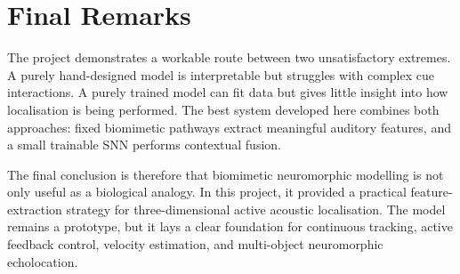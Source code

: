 \section{Final Remarks}

The project demonstrates a workable route between two unsatisfactory extremes. A purely hand-designed model is interpretable but struggles with complex cue interactions. A purely trained model can fit data but gives little insight into how localisation is being performed. The best system developed here combines both approaches: fixed biomimetic pathways extract meaningful auditory features, and a small trainable SNN performs contextual fusion.

The final conclusion is therefore that biomimetic neuromorphic modelling is not only useful as a biological analogy. In this project, it provided a practical feature-extraction strategy for three-dimensional active acoustic localisation. The model remains a prototype, but it lays a clear foundation for continuous tracking, active feedback control, velocity estimation, and multi-object neuromorphic echolocation.
